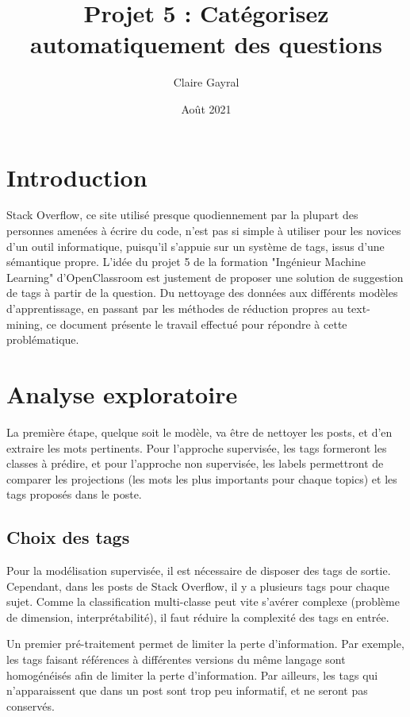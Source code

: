 \documentclass{article}
\title{Projet 5 : Catégorisez automatiquement des questions}
\author{Claire Gayral}
\date{Août 2021}
\begin{document}
\maketitle
\tableofcontents
\newpage
\section*{Introduction}
Stack Overflow, ce site utilisé presque quodiennement par la plupart des personnes amenées à écrire du code, n'est pas si simple à utiliser pour les novices d'un outil informatique, puisqu'il s'appuie sur un système de tags, issus d'une sémantique propre. L'idée du projet 5 de la formation "Ingénieur Machine Learning" d'OpenClassroom est justement de proposer une solution de suggestion de tags à partir de la question. Du nettoyage des données aux différents modèles d'apprentissage, en passant par les méthodes de réduction propres au text-mining, ce document présente le travail effectué pour répondre à cette problématique.

\section{Analyse exploratoire}
La première étape, quelque soit le modèle, va être de nettoyer les posts, et d'en extraire les mots pertinents. Pour l'approche supervisée, les tags formeront les classes à prédire, et pour l'approche non supervisée, les labels permettront de comparer les projections (les mots les plus importants pour chaque topics) et les tags proposés dans le poste. 


\subsection{Choix des tags}
Pour la modélisation supervisée, il est nécessaire de disposer des tags de sortie. Cependant, dans les posts de Stack Overflow, il y a plusieurs tags pour chaque sujet. Comme la classification multi-classe peut vite s'avérer complexe (problème de dimension, interprétabilité), il faut réduire la complexité des tags en entrée. 

Un premier pré-traitement permet de limiter la perte d'information. Par exemple, les tags faisant références à différentes versions du même langage sont homogénéisés afin de limiter la perte d'information. Par ailleurs, les tags qui n'apparaissent que dans un post sont trop peu informatif, et ne seront pas conservés. 
\end{document}
